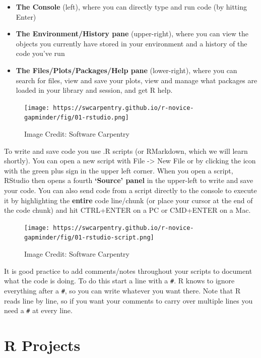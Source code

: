 \documentclass[
]{book}
\providecommand{\tightlist}{%
  \setlength{\itemsep}{0pt}\setlength{\parskip}{0pt}}
\begin{document}
\begin{itemize}
\tightlist
\item
  \textbf{The Console} (left), where you can directly type and run code (by hitting Enter)
\item
  \textbf{The Environment/History pane} (upper-right), where you can view the objects you currently have stored in your environment and a history of the code you've run
\item
  \textbf{The Files/Plots/Packages/Help pane} (lower-right), where you can search for files, view and save your plots, view and manage what packages are loaded in your library and session, and get R help.
\end{itemize}

\begin{figure}
\centering
\texttt{[image: https://swcarpentry.github.io/r-novice-gapminder/fig/01-rstudio.png]}
\caption{Image Credit: Software Carpentry}
\end{figure}

To write and save code you use .R scripts (or RMarkdown, which we will learn shortly). You can open a new script with File -\textgreater{} New File or by clicking the icon with the green plus sign in the upper left corner. When you open a script, RStudio then opens a fourth \textbf{`Source' panel} in the upper-left to write and save your code. You can also send code from a script directly to the console to execute it by highlighting the \textbf{entire} code line/chunk (or place your cursor at the end of the code chunk) and hit CTRL+ENTER on a PC or CMD+ENTER on a Mac.

\begin{figure}
\centering
\texttt{[image: https://swcarpentry.github.io/r-novice-gapminder/fig/01-rstudio-script.png]}
\caption{Image Credit: Software Carpentry}
\end{figure}

It is good practice to add comments/notes throughout your scripts to document what the code is doing. To do this start a line with a \texttt{\#}. R knows to ignore everything after a \texttt{\#}, so you can write whatever you want there. Note that R reads line by line, so if you want your comments to carry over multiple lines you need a \texttt{\#} at every line.

\hypertarget{r-projects}{%
\section{R Projects}\label{r-projects}}
\end{document}
